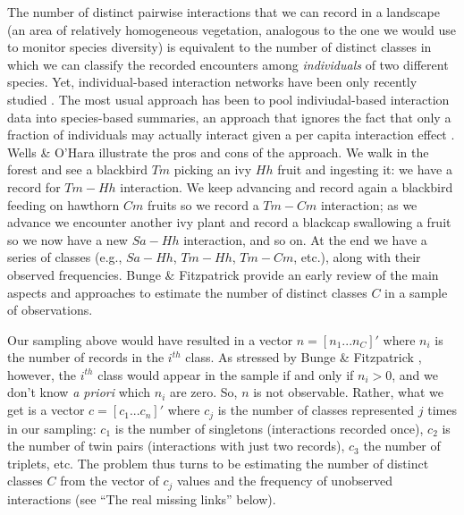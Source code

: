 \documentclass[12pt]{article}
\begin{document}
The number of distinct pairwise interactions that we can record in a landscape (an area of relatively homogeneous vegetation, analogous to the one we would use to monitor species diversity) is equivalent to the number of distinct classes in which we can classify the recorded encounters among \emph{individuals} of two different species. Yet, individual-based interaction networks have been only recently studied \citep{Dupont:2011aa,Wells:2012dy}. The most usual approach has been to pool indiviudal-based interaction data into species-based summaries, an approach that ignores the fact that only a fraction of individuals may actually interact given a per capita interaction effect \citep{Wells:2012dy}. Wells \& O'Hara \citeyearpar{Wells:2012dy} illustrate the pros and cons of the approach. We walk in the forest and see a blackbird $Tm$ picking an ivy $Hh$ fruit and ingesting it: we have a record for $Tm-Hh$ interaction. We keep advancing and record again a blackbird feeding on hawthorn $Cm$ fruits so we record a $Tm-Cm$ interaction; as we advance we encounter another ivy plant and record a blackcap swallowing a fruit so we now have a new $Sa-Hh$ interaction, and so on. At the end we have a series of classes (e.g., $Sa-Hh$, $Tm-Hh$, $Tm-Cm$, etc.), along with their observed frequencies. Bunge \& Fitzpatrick \citeyearpar{Bunge:1993ux} provide an early review of the main aspects and approaches to estimate the number of distinct classes $C$ in a sample of observations. 


Our sampling above would have resulted in a vector $n= [n_1 ... n_C]'$ where $n_i$ is the number of records in the $i^{th}$ class. As stressed by Bunge \& Fitzpatrick \citeyearpar{Bunge:1993ux}, however, the $i^{th}$ class would appear in the sample if and only if $n_i > 0$, and we don't know \emph{a priori} which $n_i$ are zero. So, $n$ is not observable. Rather, what we get is a vector $c= [c_1 ... c_n]'$ where $c_j$ is the number of classes represented $j$ times in our sampling: $c_1$ is the number of singletons (interactions recorded once), $c_2$ is the number of twin pairs (interactions with just two records), $c_3$ the number of triplets, etc. The problem thus turns to be estimating the number of distinct classes $C$ from the vector of $c_j$ values and the frequency of unobserved interactions (see ``The real missing links'' below). 
\end{document}
